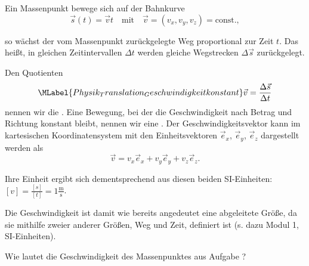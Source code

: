 \begin{MContent}


Ein Massenpunkt bewege sich auf der Bahnkurve
$$
\vec{s}(t)=\vec{v}t \quad \textrm{mit} \quad \vec{v}=(v_x,v_y,v_z)=\textrm{const.},
$$

so w\"achst der vom Massenpunkt zur\"uckgelegte Weg proportional zur Zeit $t$. Das hei{\ss}t, in gleichen Zeitintervallen $\Delta t$ werden gleiche Wegstrecken $\Delta \vec{s}$ zur\"uckgelegt. 

\begin{MInfo}
 Den Quotienten 
 \begin{equation}\MLabel{Physik_Translation_Geschwindigkeitkonstant}
 \vec{v}=\frac{\Delta \vec{s}}{\Delta t}
 \end{equation} nennen wir die . Eine Bewegung, bei der die Geschwindigkeit nach Betrag und Richtung konstant bleibt, nennen wir eine . Der Geschwindigkeitsvektor kann im kartesischen Koordinatensystem mit den Einheitsvektoren $\vec{e}_x$,  $\vec{e}_y$,  $\vec{e}_z$ dargestellt werden als
 $$
 \vec{v}=v_x\vec{e}_x+v_y\vec{e}_y+v_z\vec{e}_z.
 $$
 
 Ihre Einheit ergibt sich dementsprechend aus diesen beiden SI-Einheiten: $[v]=\frac{[s]}{[t]}=1\frac{\text{m}}{\text{s}}$.
 
 \end{MInfo}
 
 Die Geschwindigkeit ist damit wie bereits angedeutet eine abgeleitete Gr\"o{\ss}e, da sie mithilfe zweier anderer Gr\"o{\ss}en, Weg und Zeit, definiert ist (s. dazu Modul 1, SI-Einheiten). 
 
 \begin{MExercise} Wie lautet die Geschwindigkeit des Massenpunktes aus Aufgabe ?
 

\end{MExercise}
\end{MContent}
